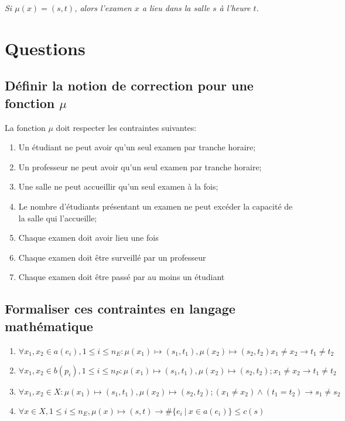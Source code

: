 \documentclass[a4paper]{article}
\begin{document}
\textit{Si $\mu(x) = (s,t)$, alors l'examen $x$ a lieu dans la salle $s$ à l'heure $t$.}

\section{Questions}
\subsection{Définir la notion de correction pour une fonction $\mu$}
La fonction $\mu$ doit respecter les contraintes suivantes:
\begin{enumerate}
  \item Un étudiant ne peut avoir qu'un seul examen par tranche horaire;
  \item Un professeur ne peut avoir qu'un seul examen par tranche horaire;
  \item Une salle ne peut accueillir qu'un seul examen à la fois;
  \item Le nombre d'étudiants présentant un examen ne peut excéder la capacité de la salle qui l'accueille;
  \item Chaque examen doit avoir lieu une fois
  \item Chaque examen doit être surveillé par un professeur
  \item Chaque examen doit être passé par au moins un étudiant
\end{enumerate}

\subsection{Formaliser ces contraintes en langage mathématique}
\begin{enumerate}
  \item $\forall x_1,x_2 \in a(e_i), 1 \le i \le n_E: \mu(x_1) \mapsto (s_1,t_1), \mu(x_2) \mapsto (s_2,t_2) x_1 \neq x_2 \rightarrow t_1 \neq t_2 $
  \item $\forall x_1,x_2 \in b(p_i), 1 \le i \le n_P: \mu(x_1) \mapsto (s_1,t_1), \mu(x_2) \mapsto (s_2,t_2); x_1 \neq x_2 \rightarrow t_1 \neq t_2 $
  \item $\forall x_1,x_2 \in X: \mu(x_1) \mapsto (s_1,t_1), \mu(x_2) \mapsto (s_2,t_2); (x_1 \neq x_2) \land (t_1 = t_2) \rightarrow s_1 \neq s_2 $
  \item $\forall x \in X, 1 \le i \le n_E, \mu(x) \mapsto (s,t) \rightarrow \#\{e_i\ |\ x \in a(e_i)\} \le c(s)$
\end{enumerate}
\end{document}
